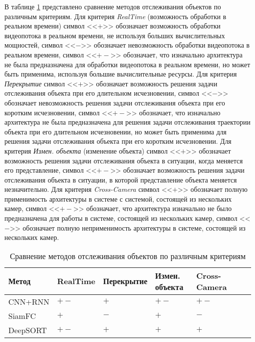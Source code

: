 В таблице \ref{tab:tracking_comparison} представлено сравнение методов отслеживания объектов по различным критериям. Для критерия \textit{RealTime} (возможность обработки в реальном времени) символ <<$+$>> обозначает возможность обработки видеопотока в реальном времени, не используя больших вычислительных мощностей, символ <<$-$>> обозначает невозможность обработки видеопотока в реальном времени, символ <<$+-$>> обозначает, что изначально архитектура не была предназначена для обработки видеопотока в реальном времени, но может быть применима, используя большие вычислительные ресурсы. Для критерия \textit{Перекрытие} символ <<$+$>> обозначает возможность решения задачи отслеживания объекта при его длительном исчезновении, символ <<$-$>> обозначает невозможность решения задачи отслеживания объекта при его коротким исчезновении, символ <<$+-$>> обозначает, что изначально архитектура не была предназначена для решения задачи отслеживания траектории объекта при его длительном исчезновении, но может быть применима для решения задачи отслеживания объекта при его коротким исчезновении. Для критерия \textit{Измен. объекта} (изменение объекта) символ <<$+$>> обозначает возможность решения задачи отслеживания объекта в ситуации, когда меняется его представление, символ <<$+-$>> обозначает возможность решения задачи отслеживания объекта в ситуации, в которой представление объекта меняется незначительно. Для критерия \textit{Cross-Camera} символ <<$+$>> обозначает полную применимость архитектуры в системе с системой, состоящей из нескольких камер, символ <<$+-$>> обозначает, что архитектура изначально не было предназначена для работы в системе, состоящей из нескольких камер, символ <<$-$>> обозначает полную неприменимость архитектуры в системе, состоящей из нескольких камер.

\begin{table}[h!]
\centering
\caption{Сравнение методов отслеживания объектов по различным критериям}
\label{tab:tracking_comparison}
\begin{tabular}{|p{3cm}|p{2cm}|p{3cm}|p{2cm}|p{2cm}|p{2cm}|p{2cm}|}
\hline
Метод & RealTime & Перекрытие & Измен. объекта  & Cross-Camera\\ \hline
CNN+RNN & $+-$ &  $+$ & $+-$ & $+-$\\ \hline
SiamFC & $+$ &  $-$ & $+$ & $-$\\ \hline
DeepSORT & $+-$ &  $+$ & $+$ & $+$\\ \hline
\end{tabular}
\end{table}

